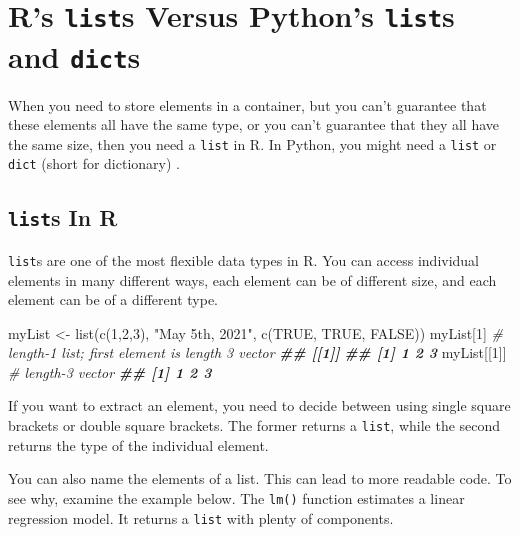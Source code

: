 \documentclass[
  12pt,
  krantz2]{krantz}
\makeatletter
\newenvironment{Shaded}{\begin{snugshade}}{\end{snugshade}}
\newcommand{\CommentTok}[1]{\textcolor[rgb]{0.37,0.37,0.37}{\textit{#1}}}
\newcommand{\ConstantTok}[1]{\textcolor[rgb]{0,0,0}{#1}}
\newcommand{\DecValTok}[1]{\textcolor[rgb]{0.06,0.06,0.06}{#1}}
\newcommand{\DocumentationTok}[1]{\textcolor[rgb]{0.37,0.37,0.37}{\textbf{\textit{#1}}}}
\newcommand{\FunctionTok}[1]{\textcolor[rgb]{0,0,0}{#1}}
\newcommand{\NormalTok}[1]{#1}
\newcommand{\OtherTok}[1]{\textcolor[rgb]{0.37,0.37,0.37}{#1}}
\newcommand{\StringTok}[1]{\textcolor[rgb]{0.5,0.5,0.5}{#1}}
\newenvironment{kframe}{%
\medskip{}
\setlength{\fboxsep}{.8em}
 \def\at@end@of@kframe{}%
 \ifinner\ifhmode%
  \def\at@end@of@kframe{\end{minipage}}%
  \begin{minipage}{\columnwidth}%
 \fi\fi%
 \def\FrameCommand##1{\hskip\@totalleftmargin \hskip-\fboxsep
 \colorbox{shadecolor}{##1}\hskip-\fboxsep
     \hskip-\linewidth \hskip-\@totalleftmargin \hskip\columnwidth}%
 \MakeFramed {\advance\hsize-\width
   \@totalleftmargin\z@ \linewidth\hsize
   \@setminipage}}%
 {\par\unskip\endMakeFramed%
 \at@end@of@kframe}
\renewenvironment{Shaded}{\begin{kframe}}{\end{kframe}}
\makeatother
\begin{document}
\hypertarget{rs-lists-versus-pythons-lists-and-dicts}{%
\chapter{\texorpdfstring{R's \texttt{list}s Versus Python's \texttt{list}s and \texttt{dict}s}{R's lists Versus Python's lists and dicts}}\label{rs-lists-versus-pythons-lists-and-dicts}}

When you need to store elements in a container, but you can't guarantee that these elements all have the same type, or you can't guarantee that they all have the same size, then you need a \texttt{list} in R. In Python, you might need a \texttt{list} or \texttt{dict} (short for dictionary) \citep{Lutz13}.

\hypertarget{lists-in-r}{%
\section{\texorpdfstring{\texttt{list}s In R}{lists In R}}\label{lists-in-r}}

\texttt{list}s are one of the most flexible data types in R. You can access individual elements in many different ways, each element can be of different size, and each element can be of a different type.

\begin{Shaded}
\begin{Highlighting}[]
\NormalTok{myList }\OtherTok{\textless{}{-}} \FunctionTok{list}\NormalTok{(}\FunctionTok{c}\NormalTok{(}\DecValTok{1}\NormalTok{,}\DecValTok{2}\NormalTok{,}\DecValTok{3}\NormalTok{), }\StringTok{"May 5th, 2021"}\NormalTok{, }\FunctionTok{c}\NormalTok{(}\ConstantTok{TRUE}\NormalTok{, }\ConstantTok{TRUE}\NormalTok{, }\ConstantTok{FALSE}\NormalTok{))}
\NormalTok{myList[}\DecValTok{1}\NormalTok{] }\CommentTok{\# length{-}1 list; first element is length 3 vector}
\DocumentationTok{\#\# [[1]]}
\DocumentationTok{\#\# [1] 1 2 3}
\NormalTok{myList[[}\DecValTok{1}\NormalTok{]] }\CommentTok{\# length{-}3 vector}
\DocumentationTok{\#\# [1] 1 2 3}
\end{Highlighting}
\end{Shaded}

If you want to extract an element, you need to decide between using single square brackets or double square brackets. The former returns a \texttt{list}, while the second returns the type of the individual element.

You can also name the elements of a list. This can lead to more readable code. To see why, examine the example below. The \texttt{lm()} function estimates a linear regression model. It returns a \texttt{list} with plenty of components.
\end{document}
